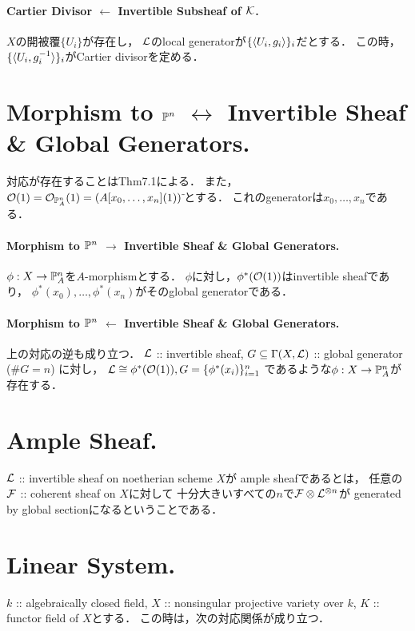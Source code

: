 \documentclass[a4paper]{jsarticle}
\begin{document}
\paragraph{Cartier Divisor $\leftarrow$ Invertible Subsheaf of $\mathcal{K}$.}
    $X$の開被覆$\{U_i\}$が存在し，
    $\mathcal{L}$のlocal generatorが$\{\langle U_i,g_i \rangle\}_i$だとする．
    この時，$\{\langle U_i,g_i^{-1} \rangle\}_i$がCartier divisorを定める．

\section{Morphism to $\mathbb{P}^n$ $\leftrightarrow$ Invertible Sheaf \& Global Generators.}
    対応が存在することはThm7.1による．
    また，$\mathcal{O}(1)=\mathcal{O}_{\mathbb{P}_A^n}(1)=(A[x_0,\dots,x_n](1))\,\tilde{}$とする．
    これのgeneratorは$x_0,\dots,x_n$である．

    \paragraph{Morphism to $\mathbb{P}^n$ $\rightarrow$ Invertible Sheaf \& Global Generators.}
    $\phi: X \to \mathbb{P}_A^n$を$A$-morphismとする．
    $\phi$に対し，$\phi^*(\mathcal{O}(1))$はinvertible sheafであり，
    $\phi^*(x_0), \dots, \phi^*(x_n)$がそのglobal generatorである．

    \paragraph{Morphism to $\mathbb{P}^n$ $\leftarrow$ Invertible Sheaf \& Global Generators.}
    上の対応の逆も成り立つ．
    $\mathcal{L}$ :: invertible sheaf,
    $G \subseteq \Gamma(X, \mathcal{L})$ :: global generator ($\#G=n$)
    に対し，
    $\mathcal{L} \cong \phi^*(\mathcal{O}(1)), G=\{\phi^*(x_i)\}_{i=1}^n$
    であるような$\phi: X \to \mathbb{P}_A^n$が存在する．

\section{Ample Sheaf.}
    \begin{Def}
        $\mathcal{L}$ :: invertible sheaf on noetherian scheme $X$が
        ample sheafであるとは，
        任意の$\mathcal{F}$ :: coherent sheaf on $X$に対して
        十分大きいすべての$n$で$\mathcal{F} \otimes \mathcal{L}^{\otimes n}$が
        generated by global sectionになるということである．
    \end{Def}

\section{Linear System.}
    $k$ :: algebraically closed field,
    $X$ :: nonsingular projective variety over $k$,
    $K$ :: functor field of $X$とする．
    この時は，次の対応関係が成り立つ．
\end{document}
